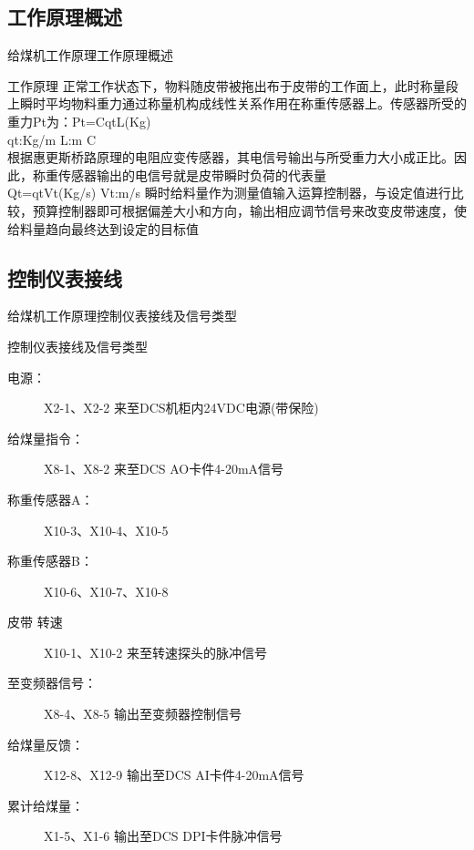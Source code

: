 \documentclass[12pt,hyperref={CJKbookmarks=true}]{beamer} %
\begin{document}
\subsection{工作原理概述}
\begin{frame}{给煤机工作原理}{工作原理概述}
\begin{exampleblock}{工作原理}
正常工作状态下，物料随皮带被拖出布于皮带的工作面上，此时称量段上瞬时平均物料重力通过称量机构成线性关系作用在称重传感器上。传感器所受的重力Pt为：Pt=CqtL(Kg)\\
qt:Kg/m L:m C\\
根据惠更斯桥路原理的电阻应变传感器，其电信号输出与所受重力大小成正比。因此，称重传感器输出的电信号就是皮带瞬时负荷的代表量\\
 Qt=qtVt(Kg/s) Vt:m/s
瞬时给料量作为测量值输入运算控制器，与设定值进行比较，预算控制器即可根据偏差大小和方向，输出相应调节信号来改变皮带速度，使给料量趋向最终达到设定的目标值
		\end{exampleblock}
	\end{frame}
\subsection{控制仪表接线}

\begin{frame}{给煤机工作原理}{控制仪表接线及信号类型}
\begin{block}{控制仪表接线及信号类型}
				\begin{description}
\item[电源：]  X2-1、X2-2 来至DCS机柜内24VDC电源(带保险)
				\item[给煤量指令：]  X8-1、X8-2 来至DCS AO卡件4-20mA信号
				\item[称重传感器A：]  X10-3、X10-4、X10-5
				\item[称重传感器B：]  X10-6、X10-7、X10-8
				\item[皮带  转速]  X10-1、X10-2 来至转速探头的脉冲信号
\item[至变频器信号：]  X8-4、X8-5 输出至变频器控制信号
\item[给煤量反馈：]  X12-8、X12-9 输出至DCS AI卡件4-20mA信号
\item[累计给煤量：]  X1-5、X1-6 输出至DCS DPI卡件脉冲信号
			\end{description}

		\end{block}

	\end{frame}
\end{document}
